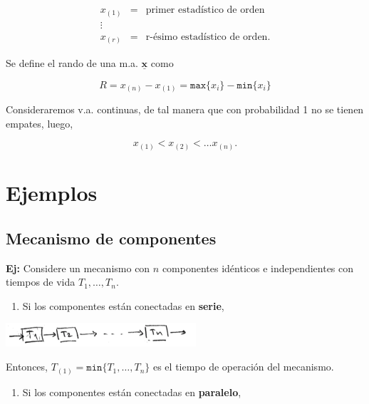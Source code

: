 \documentclass[]{book}
\providecommand{\tightlist}{%
  \setlength{\itemsep}{0pt}\setlength{\parskip}{0pt}}
\begin{document}
\[
\begin{array}{ccl}
{x_{(1)}} & = & \text{primer estadístico de orden}\\
\vdots & & \\
{x_{(r)}} & = & \text{r-ésimo estadístico de orden}.
\end{array}
\]

Se define el rando de una m.a. \(\underline{\mathbf{x}}\) como

\[
R = x_{(n)} - x_{(1)} = \texttt{max}\{x_i\}-\texttt{min}\{x_i\}
\]

Consideraremos v.a. continuas, de tal manera que con probabilidad 1 no se tienen empates, luego,

\[
x_{(1)} < x_{(2)} < \ldots x_{(n)}.
\]

\vspace{1cm}

\hypertarget{ejemplos}{%
\section{Ejemplos}\label{ejemplos}}

\hypertarget{mecanismo-de-componentes}{%
\subsection{Mecanismo de componentes}\label{mecanismo-de-componentes}}

\textbf{Ej:} Considere un mecanismo con \(n\) componentes idénticos e independientes con tiempos de vida \(T_1, \ldots, T_n\).

\begin{enumerate}
\def\labelenumi{\alph{enumi})}
\tightlist
\item
  Si los componentes están conectadas en \textbf{serie},
\end{enumerate}

\begin{center}\includegraphics[width=200pt]{imgs/estadord_ej_compserie} \end{center}

Entonces, \(T_{(1)} = \texttt{min}\{T_1, \ldots, T_n\}\) es el tiempo de operación del mecanismo.

\begin{enumerate}
\def\labelenumi{\alph{enumi})}
\setcounter{enumi}{1}
\tightlist
\item
  Si los componentes están conectadas en \textbf{paralelo},
\end{enumerate}
\end{document}
